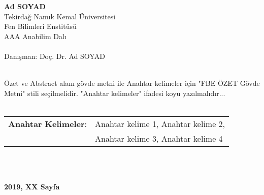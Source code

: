 \begin{center}
	
\textbf{Ad SOYAD}\\
Tekirdağ Namık Kemal Üniversitesi\\
Fen Bilimleri Enstitüsü\\
AAA Anabilim Dalı\\~\\
Danışman: Doç. Dr. Ad SOYAD
\\~\\
\end{center}

Özet ve Abstract alanı gövde metni ile Anahtar kelimeler için "FBE ÖZET Gövde Metni" stili seçilmelidir. "Anahtar kelimeler" ifadesi koyu yazılmalıdır...
\\~\\
\begin{tabular}{ll}
	\textbf{Anahtar Kelimeler}:& Anahtar kelime 1, Anahtar kelime 2, \\
	& Anahtar kelime 3, Anahtar kelime 4
\end{tabular}
\\~\\
\begin{center}
	\textbf{2019, XX Sayfa}
\end{center}


